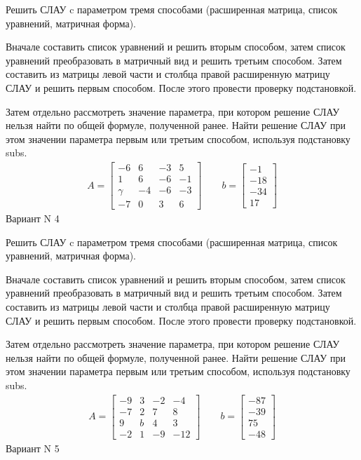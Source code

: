 \documentclass[11pt]{report}
\begin{document}
Решить СЛАУ c параметром тремя способами (расширенная матрица, список уравнений, матричная форма).

Вначале составить список уравнений и решить вторым способом,
затем список уравнений преобразовать в матричный вид и решить третьим способом.
Затем составить из матрицы левой части и столбца правой расширенную матрицу СЛАУ и решить первым способом.
После этого провести проверку подстановкой.

Затем отдельно рассмотреть значение параметра, при котором решение СЛАУ нельзя найти по общей формуле,
полученной ранее.
Найти решение СЛАУ при этом значении параметра первым или третьим способом, используя подстановку subs.
\begin{align*}
    A = \left[\begin{matrix}-6 & 6 & -3 & 5\\1 & 6 & -6 & -1\\\gamma & -4 & -6 & -3\\-7 & 0 & 3 & 6\end{matrix}\right]
\qquad b = \left[\begin{matrix}-1\\-18\\-34\\17\end{matrix}\right]
\end{align*}
\newpage
Вариант N 4


Решить СЛАУ c параметром тремя способами (расширенная матрица, список уравнений, матричная форма).

Вначале составить список уравнений и решить вторым способом,
затем список уравнений преобразовать в матричный вид и решить третьим способом.
Затем составить из матрицы левой части и столбца правой расширенную матрицу СЛАУ и решить первым способом.
После этого провести проверку подстановкой.

Затем отдельно рассмотреть значение параметра, при котором решение СЛАУ нельзя найти по общей формуле,
полученной ранее.
Найти решение СЛАУ при этом значении параметра первым или третьим способом, используя подстановку subs.
\begin{align*}
    A = \left[\begin{matrix}-9 & 3 & -2 & -4\\-7 & 2 & 7 & 8\\9 & b & 4 & 3\\-2 & 1 & -9 & -12\end{matrix}\right]
\qquad b = \left[\begin{matrix}-87\\-39\\75\\-48\end{matrix}\right]
\end{align*}
\newpage
Вариант N 5
\end{document}
